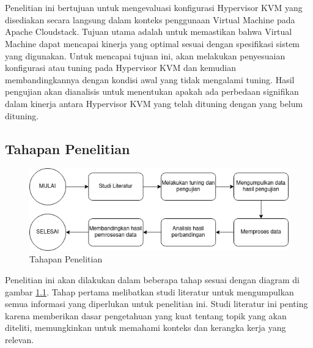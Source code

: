 \chapter{\babTiga}
Penelitian ini bertujuan untuk mengevaluasi konfigurasi Hypervisor KVM yang disediakan secara langsung dalam konteks penggunaan Virtual Machine pada Apache Cloudstack. Tujuan utama adalah untuk memastikan bahwa Virtual Machine dapat mencapai kinerja yang optimal sesuai dengan spesifikasi sistem yang digunakan. Untuk mencapai tujuan ini, \saya akan melakukan penyesuaian konfigurasi atau tuning pada Hypervisor KVM dan kemudian membandingkannya dengan kondisi awal yang tidak mengalami tuning. Hasil pengujian akan dianalisis untuk menentukan apakah ada perbedaan signifikan dalam kinerja antara Hypervisor KVM yang telah dituning dengan yang belum dituning.

\section{Tahapan Penelitian}
\begin{figure}
	\centering
	\includegraphics[width=1\textwidth]
	{assets/pics/tahapan-penelitian.png}
	\caption{Tahapan Penelitian}
	\label{fig:TahapanPenelitian}
\end{figure}

Penelitian ini akan dilakukan dalam beberapa tahap sesuai dengan diagram di gambar \ref{fig:TahapanPenelitian}. Tahap pertama melibatkan studi literatur untuk mengumpulkan semua informasi yang diperlukan untuk penelitian ini. Studi literatur ini penting karena memberikan dasar pengetahuan yang kuat tentang topik yang akan diteliti, memungkinkan \saya untuk memahami konteks dan kerangka kerja yang relevan.

